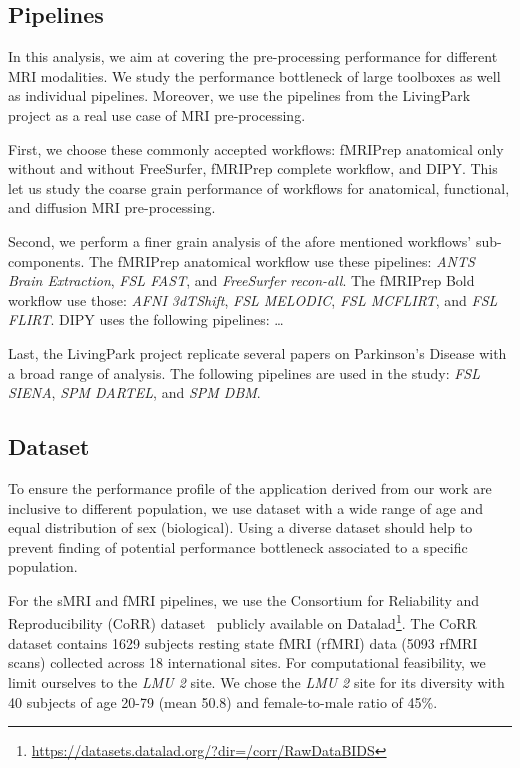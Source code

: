 \documentclass[conference]{IEEEtran}
\begin{document}
\subsection{Pipelines}
In this analysis, we aim at covering the pre-processing performance for different MRI modalities. We study the performance bottleneck of large toolboxes as well as individual pipelines. Moreover, we use the pipelines from the LivingPark project as a real use case of MRI pre-processing.

First, we choose these commonly accepted workflows: fMRIPrep anatomical only without and without FreeSurfer, fMRIPrep complete workflow, and DIPY. This let us study the coarse grain performance of workflows for anatomical, functional, and diffusion MRI pre-processing. 

Second, we perform a finer grain analysis of the afore mentioned workflows' sub-components. The fMRIPrep anatomical workflow use these pipelines: \textit{ANTS Brain Extraction}, \textit{FSL FAST}, and \textit{FreeSurfer recon-all}.
The fMRIPrep Bold workflow use those: \textit{AFNI 3dTShift}, \textit{FSL MELODIC}, \textit{FSL MCFLIRT}, and \textit{FSL FLIRT}.
DIPY uses the following pipelines: \dots

Last, the LivingPark project replicate several papers on Parkinson's Disease with a broad range of analysis. The following pipelines are used in the study: \textit{FSL SIENA}, \textit{SPM DARTEL}, and \textit{SPM DBM}.

\subsection{Dataset}
To ensure the performance profile of the application derived from our work are inclusive to different population, we use dataset with a wide range of age and equal distribution of sex (biological). Using a diverse dataset should help to prevent finding of potential performance bottleneck associated to a specific population.

For the sMRI and fMRI pipelines, we use the Consortium for Reliability and Reproducibility (CoRR) dataset~\cite{Zuo2014-xa} publicly available on Datalad\footnote{\href{https://datasets.datalad.org/?dir=/corr/RawDataBIDS}{https://datasets.datalad.org/?dir=/corr/RawDataBIDS}}. The CoRR dataset contains 1629 subjects resting state fMRI (rfMRI) data (5093 rfMRI scans) collected across 18 international sites. For computational feasibility, we limit ourselves to the \textit{LMU 2} site. We chose the \textit{LMU 2} site for its diversity with 40 subjects of age 20-79 (mean 50.8) and female-to-male ratio of 45\%.
\end{document}

